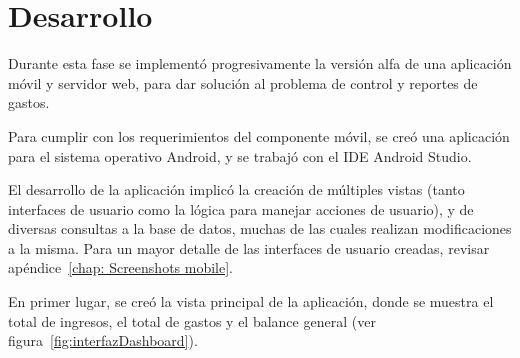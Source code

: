 \section{Desarrollo} \label{sect:desarrollo}

Durante esta fase se implementó progresivamente la versión alfa de una aplicación móvil y servidor web, para dar solución al problema de control y reportes de gastos. 

Para cumplir con los requerimientos del componente móvil, se creó una aplicación para el sistema operativo Android, y se trabajó con el IDE Android Studio. 

El desarrollo de la aplicación implicó la creación de múltiples vistas (tanto interfaces de usuario como la lógica para manejar acciones de usuario), y de diversas consultas a la base de datos, muchas de las cuales realizan modificaciones a la misma. Para un mayor detalle de las interfaces de usuario creadas, revisar apéndice~\ref{chap: Screenshots mobile}.

En primer lugar, se creó la vista principal de la aplicación, donde se muestra el total de ingresos, el total de gastos y el balance general (ver figura~\ref{fig:interfazDashboard}).

